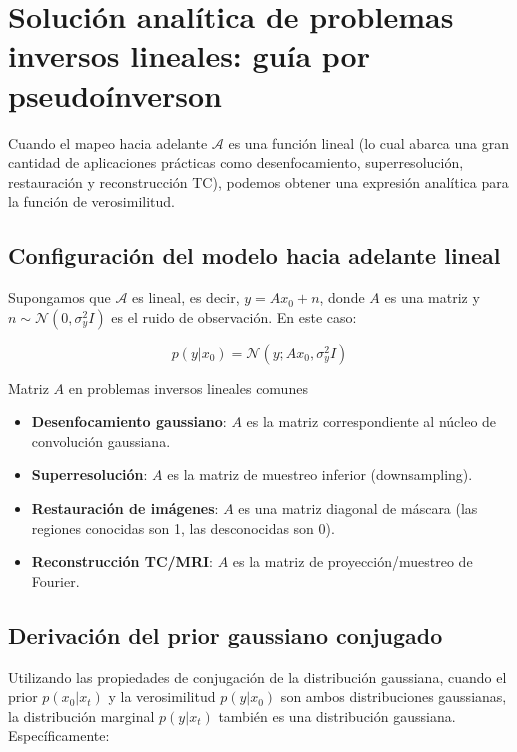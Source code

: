 \section{Solución analítica de problemas inversos lineales: guía por pseudoínverson}

Cuando el mapeo hacia adelante $\mathcal{A}$ es una función lineal (lo cual abarca una gran cantidad de aplicaciones prácticas como desenfocamiento, superresolución, restauración y reconstrucción TC), podemos obtener una expresión analítica para la función de verosimilitud.

\subsection{Configuración del modelo hacia adelante lineal}

Supongamos que $\mathcal{A}$ es lineal, es decir, $y = A x_0 + n$, donde $A$ es una matriz y $n \sim \mathcal{N}(0, \sigma_y^2 I)$ es el ruido de observación. En este caso:

$$
p(y | x_0) = \mathcal{N}(y; A x_0, \sigma_y^2 I)
$$

\begin{knowledgebox}{Matriz $A$ en problemas inversos lineales comunes}
\begin{itemize}
    \item \textbf{Desenfocamiento gaussiano}: $A$ es la matriz correspondiente al núcleo de convolución gaussiana.
    \item \textbf{Superresolución}: $A$ es la matriz de muestreo inferior (downsampling).
    \item \textbf{Restauración de imágenes}: $A$ es una matriz diagonal de máscara (las regiones conocidas son 1, las desconocidas son 0).
    \item \textbf{Reconstrucción TC/MRI}: $A$ es la matriz de proyección/muestreo de Fourier.
\end{itemize}
\end{knowledgebox}

\subsection{Derivación del prior gaussiano conjugado}

Utilizando las propiedades de conjugación de la distribución gaussiana, cuando el prior $p(x_0 | x_t)$ y la verosimilitud $p(y|x_0)$ son ambos distribuciones gaussianas, la distribución marginal $p(y | x_t)$ también es una distribución gaussiana. Específicamente:

